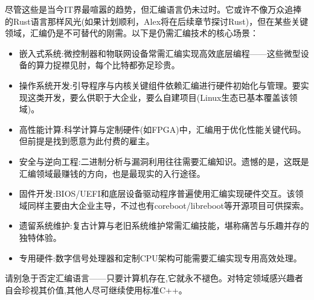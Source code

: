 尽管这些是当今IT界最喧嚣的趋势，但汇编语言仍未过时。它或许不像万众追捧的Rust语言那样风光(如果计划顺利，Alex将在后续章节探讨Rust)，但在某些关键领域，汇编仍是不可替代的刚需。以下是仍需汇编技术的核心场景：

\begin{itemize}
\item 
嵌入式系统:微控制器和物联网设备常需汇编实现高效底层编程——这些微型设备的算力捉襟见肘，每个比特都弥足珍贵。

\item 
操作系统开发:引导程序与内核关键组件依赖汇编进行硬件初始化与管理。要实现这类开发，要么供职于大企业，要么自建项目(Linux生态已基本覆盖该领域)。

\item 
高性能计算:科学计算与定制硬件(如FPGA)中，汇编用于优化性能关键代码。但前提是找到愿意为此付费的雇主。

\item 
安全与逆向工程:二进制分析与漏洞利用往往需要汇编知识。遗憾的是，这既是汇编领域最赚钱的方向，也是最现实的入行途径。

\item 
固件开发:BIOS/UEFI和底层设备驱动程序普遍使用汇编实现硬件交互。该领域同样主要由大企业主导，不过也有coreboot/libreboot等开源项目可供探索。

\item 
遗留系统维护:复古计算与老旧系统维护常需汇编技能，堪称痛苦与乐趣并存的独特体验。

\item 
专用硬件:数字信号处理器和定制CPU架构可能需要汇编实现专用高效处理。
\end{itemize}

请别急于否定汇编语言——只要计算机存在,它就永不褪色。对特定领域感兴趣者自会珍视其价值,其他人尽可继续使用标准C++。

